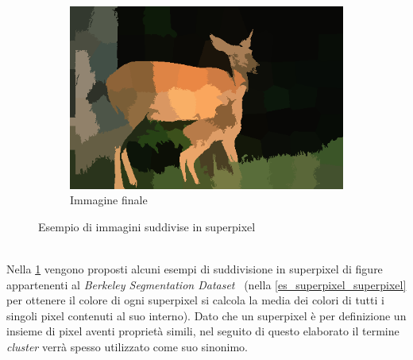 \documentclass[12pt,a4paper,oneside]{article}
\begin{document}
\begin{figure}[!htb]
\begin{subfigure}[t]{.325\textwidth}
		\includegraphics[width=\textwidth]{resources/images/es3_superpixel_superpixel.png}
		\caption{Immagine finale}
	\end{subfigure}%
	\caption{Esempio di immagini suddivise in superpixel}\label{es_superpixel}
\end{figure}
\\Nella \cref{es_superpixel} vengono proposti alcuni esempi di suddivisione in superpixel di figure appartenenti al \textit{Berkeley Segmentation Dataset}~\cite{BERKELEY_DATASET} (nella \cref{es_superpixel_superpixel} per ottenere il colore di ogni superpixel si calcola la media dei colori di tutti i singoli pixel contenuti al suo interno). Dato che un superpixel è per definizione un insieme di pixel aventi proprietà simili, nel seguito di questo elaborato il termine \textit{cluster} verrà spesso utilizzato come suo sinonimo.
\end{document}
